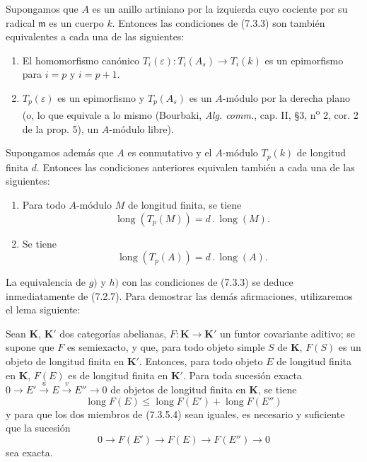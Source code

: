 \begin{proposition}[7.3.5]
Supongamos que $A$ es un anillo artiniano por la izquierda cuyo cociente por su
radical $\mathfrak m$ es un cuerpo $k$. Entonces las condiciones de \textup{(7.3.3)} son
también equivalentes a cada una de las siguientes:
\begin{enumerate}
  \item[g)] El homomorfismo canónico
    $T_i(\varepsilon):T_i(A_s)\longrightarrow T_i(k)$
    es un epimorfismo para $i=p$ y $i=p+1$.
  \item[h)] $T_p(\varepsilon)$ es un epimorfismo y $T_p(A_s)$ es un
    $A$-módulo por la derecha plano \textup{(o, lo que equivale a lo mismo (Bourbaki,
    \emph{Alg. comm.}, cap. II, \S 3, n\textsuperscript{o} 2, cor. 2 de la
    prop. 5), un $A$-módulo} libre).
\end{enumerate}
Supongamos además que $A$ es conmutativo y el $A$-módulo $T_p(k)$ de
longitud finita $d$. Entonces las condiciones anteriores equivalen también a
cada una de las siguientes:
\begin{enumerate}
  \item[i)] Para todo $A$-módulo $M$ de longitud finita, se tiene
    \[
      \operatorname{long}(T_p(M))=d\mathbin{.}\operatorname{long}(M).
      \tag{7.3.5.1}\label{III.7.3.5.1.fr}
    \]
  \item[j)] Se tiene
    \[
      \operatorname{long}(T_p(A))=d\mathbin{.}\operatorname{long}(A).
      \tag{7.3.5.2}\label{III.7.3.5.2.fr}
    \]
\end{enumerate}
\end{proposition}

La equivalencia de $g)$ y $h)$ con las condiciones de (7.3.3) se deduce inmediatamente
de (7.2.7). Para demostrar las demás afirmaciones, utilizaremos el lema
siguiente:

\begin{lemma}[7.3.5.3]
Sean $\boldsymbol{K}$, $\boldsymbol{K}'$ dos categorías abelianas,
$F:\boldsymbol{K}\to\boldsymbol{K}'$ un funtor
covariante aditivo; se supone que $F$ es semiexacto, y que, para todo objeto
simple $S$ de $\boldsymbol{K}$, $F(S)$ es un objeto de longitud finita en
$\boldsymbol{K}'$. Entonces, para todo objeto $E$ de longitud finita en $\boldsymbol{K}$,
$F(E)$ es de longitud finita en $\boldsymbol{K}'$. Para toda sucesión exacta
$0\longrightarrow E'\xrightarrow{u}E\xrightarrow{v}E''\longrightarrow0$
de objetos de longitud finita en $\boldsymbol{K}$, se tiene
\[
  \operatorname{long}F(E)
  \leq
  \operatorname{long}F(E')+\operatorname{long}F(E'')
  \tag{7.3.5.4}\label{III.7.3.5.4.fr}
\]
y para que los dos miembros de \textup{(7.3.5.4)} sean iguales, es necesario y suficiente
que la sucesión
\[
  0\longrightarrow F(E')\longrightarrow F(E)\longrightarrow F(E'')
  \longrightarrow0
\]
sea exacta.
\end{lemma}

